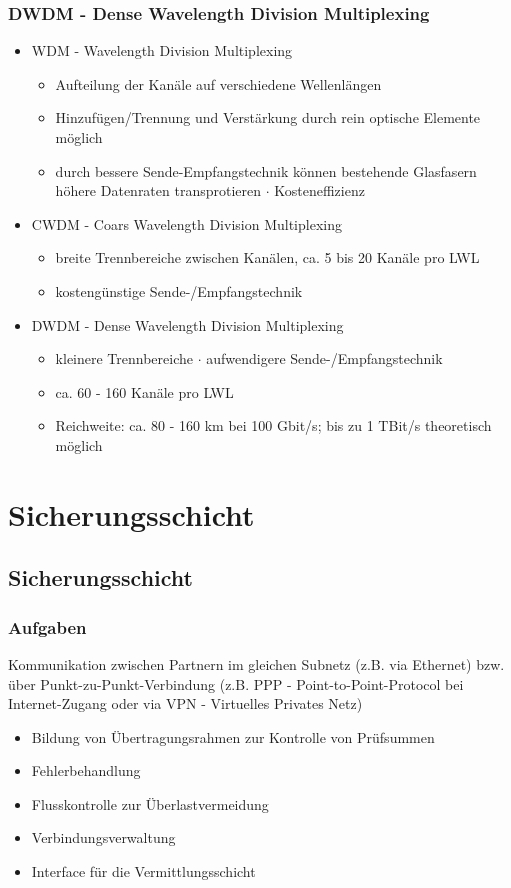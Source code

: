 \subsubsection{DWDM - Dense Wavelength Division Multiplexing}
\begin{itemize}
	\item WDM - Wavelength Division Multiplexing
	\begin{itemize}
		\item Aufteilung der Kanäle auf verschiedene Wellenlängen
		\item Hinzufügen/Trennung und Verstärkung durch rein optische Elemente möglich
		\item durch bessere Sende-Empfangstechnik können bestehende Glasfasern höhere Datenraten transprotieren \(\cdot\) Kosteneffizienz
	\end{itemize}
	\item CWDM - Coars Wavelength Division Multiplexing
	\begin{itemize}
		\item breite Trennbereiche zwischen Kanälen, ca. 5 bis 20 Kanäle pro LWL
		\item kostengünstige Sende-/Empfangstechnik
	\end{itemize}
	\item DWDM - Dense Wavelength Division Multiplexing
	\begin{itemize}
		\item kleinere Trennbereiche \(\cdot\) aufwendigere Sende-/Empfangstechnik
		\item ca. 60 - 160 Kanäle pro LWL
		\item Reichweite: ca. 80 - 160 km bei 100 Gbit/s; bis zu 1 TBit/s theoretisch möglich
	\end{itemize}
\end{itemize}

\section{Sicherungsschicht}
\subsection{Sicherungsschicht}
\subsubsection{Aufgaben}
Kommunikation zwischen Partnern im gleichen Subnetz (z.B. via Ethernet) bzw. über Punkt-zu-Punkt-Verbindung (z.B. PPP - Point-to-Point-Protocol bei Internet-Zugang oder via VPN - Virtuelles Privates Netz)
\begin{itemize}
\item Bildung von Übertragungsrahmen zur Kontrolle von Prüfsummen
\item Fehlerbehandlung
\item Flusskontrolle zur Überlastvermeidung
\item Verbindungsverwaltung
\item Interface für die Vermittlungsschicht
\end{itemize}
